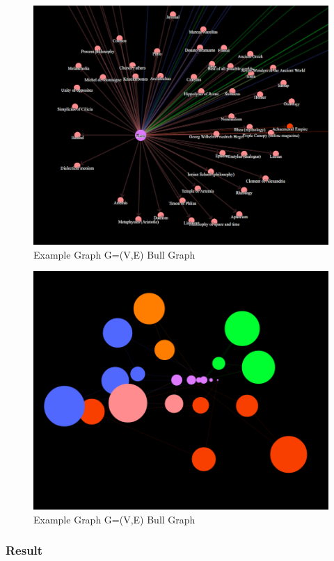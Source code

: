 \begin{figure}[H]
\centering
\includegraphics[scale=0.3]{t6.png}
\caption{Example Graph G=(V,E) Bull Graph}
\end{figure}

\begin{figure}[H]
\centering
\includegraphics[scale=0.3]{t7.png}
\caption{Example Graph G=(V,E) Bull Graph}
\end{figure}


\subsubsection{Result}

